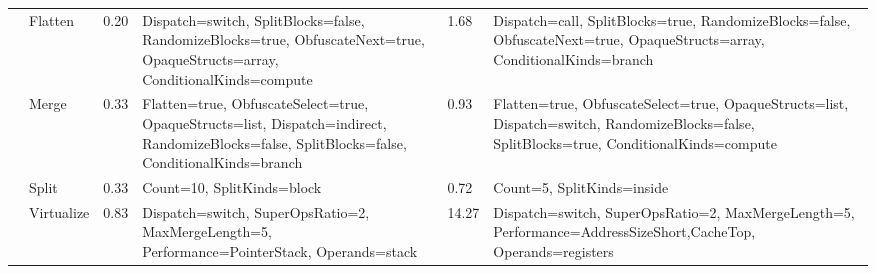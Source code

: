 \begin{table*}[!hp]
\begin{footnotesize}
\begin{tabular}{|p{1.5cm}|l|l|p{5cm}|l|p{5cm}|}
                                                                               & Flatten                                                                & 0.20                                                    &  Dispatch=switch, SplitBlocks=false, RandomizeBlocks=true, ObfuscateNext=true, OpaqueStructs=array, ConditionalKinds=compute                                                             & 1.68                                                    &  Dispatch=call, SplitBlocks=true, RandomizeBlocks=false, ObfuscateNext=true, OpaqueStructs=array, ConditionalKinds=branch                                                                    \\ \cline{2-6} 
                                                                               & Merge                                                                  & 0.33                                                    &  Flatten=true, ObfuscateSelect=true, OpaqueStructs=list, Dispatch=indirect, RandomizeBlocks=false, SplitBlocks=false, ConditionalKinds=branch                                            & 0.93                                                    &  Flatten=true, ObfuscateSelect=true, OpaqueStructs=list, Dispatch=switch, RandomizeBlocks=false, SplitBlocks=true, ConditionalKinds=compute                                                  \\ \cline{2-6} 
                                                                               & Split                                                                  & 0.33                                                    &  Count=10, SplitKinds=block                                                                                                                                                              & 0.72                                                    &  Count=5, SplitKinds=inside                                                                                                                                                                  \\ \cline{2-6} 
                                                                               & Virtualize                                                             & 0.83                                                    &  Dispatch=switch, SuperOpsRatio=2, MaxMergeLength=5, Performance=PointerStack, Operands=stack                                                                                            & 14.27                                                   &  Dispatch=switch, SuperOpsRatio=2, MaxMergeLength=5, Performance=AddressSizeShort,CacheTop, Operands=registers                                                                               \\ \hline

\end{tabular}
\end{footnotesize}
\end{table*}
